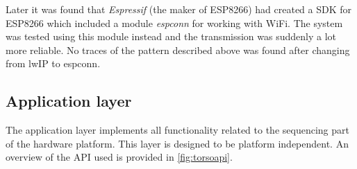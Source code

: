 Later it was found that \textit{Espressif} (the maker of ESP8266) had created a SDK for ESP8266 which included a module \textit{espconn} for working with WiFi. The system was tested using this module instead and the transmission was suddenly a lot more reliable. No traces of the pattern described above was found after changing from lwIP to espconn.






\subsection{Application layer}
\label{sec:applicationlayer}

The application layer implements all functionality related to the sequencing part of the hardware platform. This layer is designed to be platform independent. An overview of the API used is provided in \cref{fig:torsoapi}.

